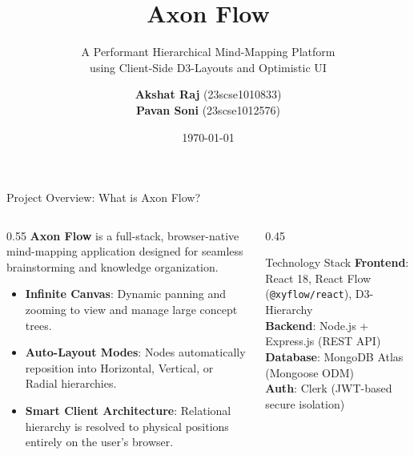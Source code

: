 \documentclass[aspectratio=169, 10pt]{beamer}
\title[\textbf{Axon Flow}]{\Huge \textbf{Axon Flow}}
\subtitle{A Performant Hierarchical Mind-Mapping Platform \\ using Client-Side D3-Layouts and Optimistic UI}
\author[Akshat Raj \& Pavan Soni]{\textbf{Akshat Raj} (23scse1010833) \\ \textbf{Pavan Soni} (23scse1012576)}
\institute[GU]{Department of Computer Science \& Engineering \\ Galgotias University}
\date{\today}
\begin{document}
\begin{frame}[plain]
  \titlepage
\end{frame}

\begin{frame}{Project Overview: What is Axon Flow?}
  \begin{columns}
    \begin{column}{0.55\textwidth}
      \textbf{Axon Flow} is a full-stack, browser-native mind-mapping application designed for seamless brainstorming and knowledge organization.
      \vspace{0.4em}
      \begin{itemize}
        \item[\textcolor{axonpurple}{\tiny$\blacksquare$}] \textbf{Infinite Canvas}: Dynamic panning and zooming to view and manage large concept trees.
        \item[\textcolor{axonpurple}{\tiny$\blacksquare$}] \textbf{Auto-Layout Modes}: Nodes automatically reposition into Horizontal, Vertical, or Radial hierarchies.
        \item[\textcolor{axonpurple}{\tiny$\blacksquare$}] \textbf{Smart Client Architecture}: Relational hierarchy is resolved to physical positions entirely on the user's browser.
      \end{itemize}
    \end{column}
    \begin{column}{0.45\textwidth}
      \begin{block}{Technology Stack}
        \textbf{Frontend}: React 18, React Flow (\texttt{@xyflow/react}), D3-Hierarchy\\
        \textbf{Backend}: Node.js + Express.js (REST API)\\
        \textbf{Database}: MongoDB Atlas (Mongoose ODM)\\
        \textbf{Auth}: Clerk (JWT-based secure isolation)
      \end{block}
    \end{column}
  \end{columns}
\end{frame}
\end{document}
